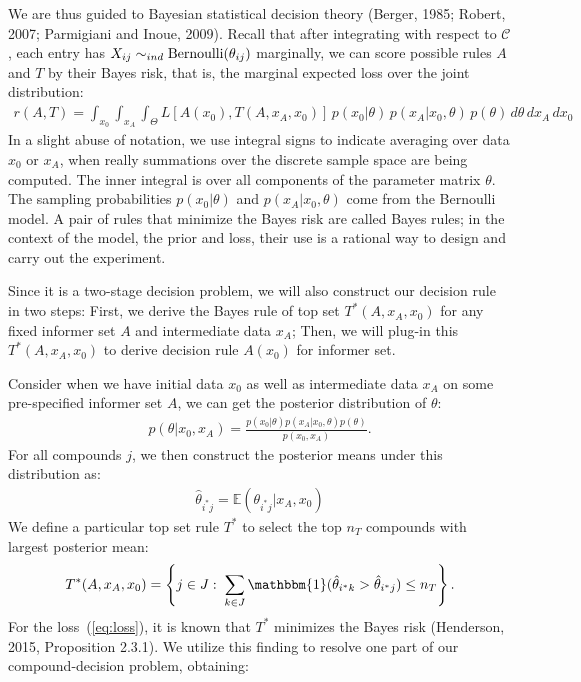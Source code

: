 \documentclass[12pt]{article}
\begin{document}
We are thus guided to Bayesian statistical decision theory (Berger, 1985;
Robert, 2007; Parmigiani and Inoue, 2009). Recall that after integrating with respect to $\mathcal{C}$, each entry has $X_{ij} \sim_{ind} {\rm Bernoulli}(\theta_{ij})$ marginally, we can score possible rules $A$ and $T$ by their Bayes risk, that is, the marginal expected loss over the joint distribution:
\begin{eqnarray}
\label{eq:risk}
r(A, T) 
= \int_{x_0} \int_{x_A} \int_\Theta  L\left[ A(x_0), T(A,x_A,x_0) \right] \,
 p(x_0| \theta) \, p(x_A|x_0, \theta) \, p(\theta) \, d\theta \, d x_A \, d x_0
\end{eqnarray}
In a slight abuse of notation, we use integral signs to indicate averaging over data $x_0$ or 
$x_A$, when really summations over the discrete sample space are being computed.  The inner
integral is over all components of the parameter matrix $\theta$. The sampling probabilities $p(x_0|\theta)$ and $p(x_A|x_0,\theta)$ 
come from the Bernoulli model.  A pair of rules that
minimize the Bayes risk are called Bayes rules; 
in the context of the model, the prior and loss, their use is
a rational way to design and carry out the experiment.

Since it is a two-stage decision problem, we will also construct our decision rule in two steps: First, we derive the Bayes rule of top set $T^*(A,x_A,x_0)$ for any fixed informer set $A$ and intermediate data $x_A$; Then, we will plug-in this $T^*(A,x_A,x_0)$ to derive decision rule $A(x_0)$ for informer set. 

Consider when we have initial data $x_0$ as well as intermediate data $x_A$ on
some pre-specified informer set $A$, we can get the posterior distribution of $\theta$:
\begin{eqnarray*}
p(\theta|x_0,x_A) = \frac{ p(x_0|\theta) p(x_A|x_0, \theta) p(\theta) }{ p(x_0, x_A) }.
\end{eqnarray*}
For all compounds $j$, we then construct the posterior means under this distribution as:
\begin{eqnarray*}
\hat \theta_{i^*j} = \mathbb{E}\left( \theta_{i^*j} |x_A, x_0 \right)
\end{eqnarray*}
We define a particular top set rule $T^*$ to select the top $n_T$ compounds with largest posterior mean:
\begin{eqnarray}
\label{eq:topset}
T^*(A,x_A,x_0) = \left\{ j \in J: \; \sum_{k\in J} \mathbbm{1}(\hat \theta_{i^*k} > \hat \theta_{i^*j}) \leq n_T \right\}.
\end{eqnarray}
For the loss~(\ref{eq:loss}), it is known that $T^*$ minimizes the Bayes risk (Henderson, 2015, Proposition 2.3.1).
We utilize this finding to resolve one part of our compound-decision problem, obtaining:
\end{document}
